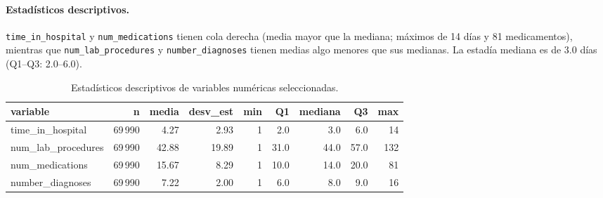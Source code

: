 \documentclass[11pt,a4paper]{article}
\newcommand{\cod}[1]{\texttt{#1}}
\newenvironment{tablaentex}[2]{%
  \begin{table}[H]\centering\small\caption{#1}\label{#2}\begin{adjustbox}{max width=\textwidth}}%
  {\end{adjustbox}\end{table}}
\begin{document}
\paragraph{Estadísticos descriptivos.} \cod{time\_in\_hospital} y \cod{num\_medications} tienen cola derecha (media mayor que la mediana; máximos de 14 días y 81 medicamentos), mientras que \cod{num\_lab\_procedures} y \cod{number\_diagnoses} tienen medias algo menores que sus medianas. La estadía mediana es de 3.0 días (Q1--Q3: 2.0--6.0).
\begin{tablaentex}{Estadísticos descriptivos de variables numéricas seleccionadas.}{tab:desc}
\begin{tabular}{lrrrrrrrr}
\toprule
variable & n & media & desv\_est & min & Q1 & mediana & Q3 & max \\
\midrule
time\_in\_hospital & 69\,990 & 4.27 & 2.93 & 1 & 2.0 & 3.0 & 6.0 & 14 \\
num\_lab\_procedures & 69\,990 & 42.88 & 19.89 & 1 & 31.0 & 44.0 & 57.0 & 132 \\
num\_medications & 69\,990 & 15.67 & 8.29 & 1 & 10.0 & 14.0 & 20.0 & 81 \\
number\_diagnoses & 69\,990 & 7.22 & 2.00 & 1 & 6.0 & 8.0 & 9.0 & 16 \\
\bottomrule
\end{tabular}
\end{tablaentex}
\end{document}
